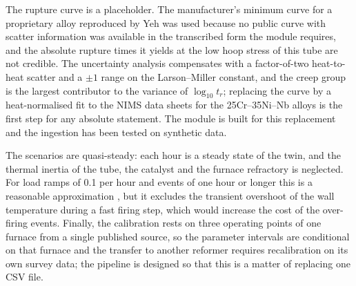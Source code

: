 The rupture curve is a placeholder. The manufacturer's minimum curve for a proprietary alloy reproduced by Yeh \cite{yeh2021} was
used because no public curve with scatter information was available in the transcribed form the module requires, and the absolute
rupture times it yields at the low hoop stress of this tube are not credible. The uncertainty analysis compensates with a
factor-of-two heat-to-heat scatter and a $\pm 1$ range on the Larson--Miller constant, and the creep group is the largest
contributor to the variance of $\log_{10} t_r$; replacing the curve by a heat-normalised fit to the NIMS data sheets for the
25Cr--35Ni--Nb alloys \cite{nims1990,nims1991} is the first step for any absolute statement. The module is built for this
replacement and the ingestion has been tested on synthetic data.

The scenarios are quasi-steady: each hour is a steady state of the twin, and the thermal inertia of the tube, the catalyst and the
furnace refractory is neglected. For load ramps of 0.1 per hour and events of one hour or longer this is a reasonable approximation
, but it excludes the transient overshoot of the
wall temperature during a fast firing step, which would increase the cost of the over-firing events. Finally, the calibration rests
on three operating points of one furnace from a single published source, so the parameter intervals are conditional on that
furnace and the transfer to another reformer requires recalibration on its own survey data; the pipeline is designed so that this
is a matter of replacing one CSV file.
